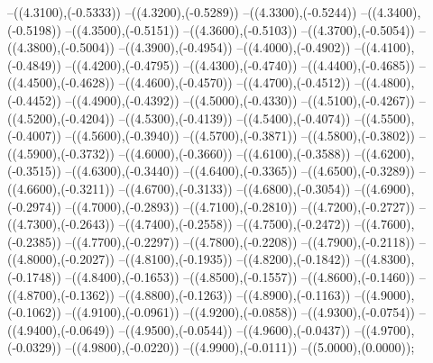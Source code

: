 {	--({\sx*(4.3100)},{\sy*(-0.5333)})
	--({\sx*(4.3200)},{\sy*(-0.5289)})
	--({\sx*(4.3300)},{\sy*(-0.5244)})
	--({\sx*(4.3400)},{\sy*(-0.5198)})
	--({\sx*(4.3500)},{\sy*(-0.5151)})
	--({\sx*(4.3600)},{\sy*(-0.5103)})
	--({\sx*(4.3700)},{\sy*(-0.5054)})
	--({\sx*(4.3800)},{\sy*(-0.5004)})
	--({\sx*(4.3900)},{\sy*(-0.4954)})
	--({\sx*(4.4000)},{\sy*(-0.4902)})
	--({\sx*(4.4100)},{\sy*(-0.4849)})
	--({\sx*(4.4200)},{\sy*(-0.4795)})
	--({\sx*(4.4300)},{\sy*(-0.4740)})
	--({\sx*(4.4400)},{\sy*(-0.4685)})
	--({\sx*(4.4500)},{\sy*(-0.4628)})
	--({\sx*(4.4600)},{\sy*(-0.4570)})
	--({\sx*(4.4700)},{\sy*(-0.4512)})
	--({\sx*(4.4800)},{\sy*(-0.4452)})
	--({\sx*(4.4900)},{\sy*(-0.4392)})
	--({\sx*(4.5000)},{\sy*(-0.4330)})
	--({\sx*(4.5100)},{\sy*(-0.4267)})
	--({\sx*(4.5200)},{\sy*(-0.4204)})
	--({\sx*(4.5300)},{\sy*(-0.4139)})
	--({\sx*(4.5400)},{\sy*(-0.4074)})
	--({\sx*(4.5500)},{\sy*(-0.4007)})
	--({\sx*(4.5600)},{\sy*(-0.3940)})
	--({\sx*(4.5700)},{\sy*(-0.3871)})
	--({\sx*(4.5800)},{\sy*(-0.3802)})
	--({\sx*(4.5900)},{\sy*(-0.3732)})
	--({\sx*(4.6000)},{\sy*(-0.3660)})
	--({\sx*(4.6100)},{\sy*(-0.3588)})
	--({\sx*(4.6200)},{\sy*(-0.3515)})
	--({\sx*(4.6300)},{\sy*(-0.3440)})
	--({\sx*(4.6400)},{\sy*(-0.3365)})
	--({\sx*(4.6500)},{\sy*(-0.3289)})
	--({\sx*(4.6600)},{\sy*(-0.3211)})
	--({\sx*(4.6700)},{\sy*(-0.3133)})
	--({\sx*(4.6800)},{\sy*(-0.3054)})
	--({\sx*(4.6900)},{\sy*(-0.2974)})
	--({\sx*(4.7000)},{\sy*(-0.2893)})
	--({\sx*(4.7100)},{\sy*(-0.2810)})
	--({\sx*(4.7200)},{\sy*(-0.2727)})
	--({\sx*(4.7300)},{\sy*(-0.2643)})
	--({\sx*(4.7400)},{\sy*(-0.2558)})
	--({\sx*(4.7500)},{\sy*(-0.2472)})
	--({\sx*(4.7600)},{\sy*(-0.2385)})
	--({\sx*(4.7700)},{\sy*(-0.2297)})
	--({\sx*(4.7800)},{\sy*(-0.2208)})
	--({\sx*(4.7900)},{\sy*(-0.2118)})
	--({\sx*(4.8000)},{\sy*(-0.2027)})
	--({\sx*(4.8100)},{\sy*(-0.1935)})
	--({\sx*(4.8200)},{\sy*(-0.1842)})
	--({\sx*(4.8300)},{\sy*(-0.1748)})
	--({\sx*(4.8400)},{\sy*(-0.1653)})
	--({\sx*(4.8500)},{\sy*(-0.1557)})
	--({\sx*(4.8600)},{\sy*(-0.1460)})
	--({\sx*(4.8700)},{\sy*(-0.1362)})
	--({\sx*(4.8800)},{\sy*(-0.1263)})
	--({\sx*(4.8900)},{\sy*(-0.1163)})
	--({\sx*(4.9000)},{\sy*(-0.1062)})
	--({\sx*(4.9100)},{\sy*(-0.0961)})
	--({\sx*(4.9200)},{\sy*(-0.0858)})
	--({\sx*(4.9300)},{\sy*(-0.0754)})
	--({\sx*(4.9400)},{\sy*(-0.0649)})
	--({\sx*(4.9500)},{\sy*(-0.0544)})
	--({\sx*(4.9600)},{\sy*(-0.0437)})
	--({\sx*(4.9700)},{\sy*(-0.0329)})
	--({\sx*(4.9800)},{\sy*(-0.0220)})
	--({\sx*(4.9900)},{\sy*(-0.0111)})
	--({\sx*(5.0000)},{\sy*(0.0000)});
}
